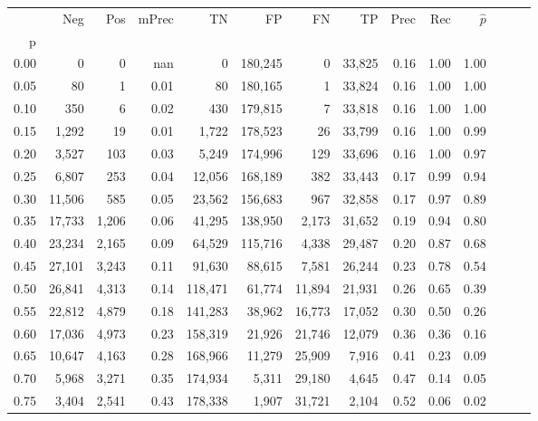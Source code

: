 \begin{tabular}{rrrrrrrrrrrrrr}
\toprule
{} &     Neg &    Pos & mPrec &       TN &       FP &      FN &      TP &  Prec &   Rec & $\hat{p}$ \\
p    &         &        &       &          &          &         &         &       &       &           \\
\midrule
0.00 &       0 &      0 &   nan &        0 &  180,245 &       0 &  33,825 &  0.16 &  1.00 &      1.00 \\
0.05 &      80 &      1 &  0.01 &       80 &  180,165 &       1 &  33,824 &  0.16 &  1.00 &      1.00 \\
0.10 &     350 &      6 &  0.02 &      430 &  179,815 &       7 &  33,818 &  0.16 &  1.00 &      1.00 \\
0.15 &   1,292 &     19 &  0.01 &    1,722 &  178,523 &      26 &  33,799 &  0.16 &  1.00 &      0.99 \\
0.20 &   3,527 &    103 &  0.03 &    5,249 &  174,996 &     129 &  33,696 &  0.16 &  1.00 &      0.97 \\
0.25 &   6,807 &    253 &  0.04 &   12,056 &  168,189 &     382 &  33,443 &  0.17 &  0.99 &      0.94 \\
0.30 &  11,506 &    585 &  0.05 &   23,562 &  156,683 &     967 &  32,858 &  0.17 &  0.97 &      0.89 \\
0.35 &  17,733 &  1,206 &  0.06 &   41,295 &  138,950 &   2,173 &  31,652 &  0.19 &  0.94 &      0.80 \\
0.40 &  23,234 &  2,165 &  0.09 &   64,529 &  115,716 &   4,338 &  29,487 &  0.20 &  0.87 &      0.68 \\
0.45 &  27,101 &  3,243 &  0.11 &   91,630 &   88,615 &   7,581 &  26,244 &  0.23 &  0.78 &      0.54 \\
0.50 &  26,841 &  4,313 &  0.14 &  118,471 &   61,774 &  11,894 &  21,931 &  0.26 &  0.65 &      0.39 \\
0.55 &  22,812 &  4,879 &  0.18 &  141,283 &   38,962 &  16,773 &  17,052 &  0.30 &  0.50 &      0.26 \\
0.60 &  17,036 &  4,973 &  0.23 &  158,319 &   21,926 &  21,746 &  12,079 &  0.36 &  0.36 &      0.16 \\
0.65 &  10,647 &  4,163 &  0.28 &  168,966 &   11,279 &  25,909 &   7,916 &  0.41 &  0.23 &      0.09 \\
0.70 &   5,968 &  3,271 &  0.35 &  174,934 &    5,311 &  29,180 &   4,645 &  0.47 &  0.14 &      0.05 \\
0.75 &   3,404 &  2,541 &  0.43 &  178,338 &    1,907 &  31,721 &   2,104 &  0.52 &  0.06 &      0.02 \\

\end{tabular}
